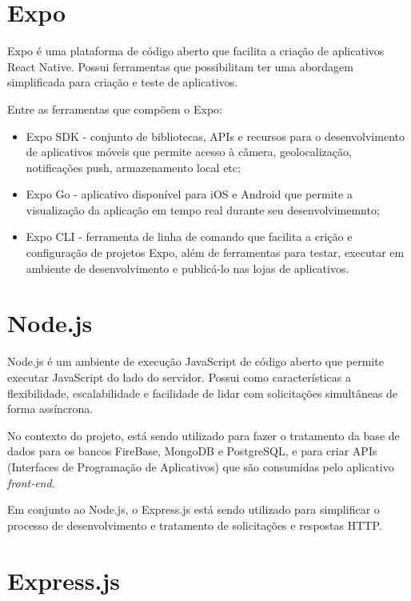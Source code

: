 \section{Expo}
\label{sec:Expo}
Expo é uma plataforma de código aberto que facilita a criação de aplicativos React Native. Possui ferramentas que  
possibilitam ter uma abordagem simplificada para criação e teste de aplicativos.

\begin{description}
    \item Entre as ferramentas que compõem o Expo:
          \begin{itemize}
              \item Expo SDK - conjunto de bibliotecas, APIs e recursos para o desenvolvimento de aplicativos móveis que permite acesso 
              à câmera, geolocalização, notificações push, armazenamento local etc;

              \item Expo Go - aplicativo disponível para iOS e Android que permite a visualização da aplicação em tempo real durante seu 
              desenvolvimemnto;

              \item Expo CLI - ferramenta de linha de comando que facilita a crição e configuração de projetos Expo, além de ferramentas para 
              testar, executar em ambiente de desenvolvimento e publicá-lo nas lojas de aplicativos.
          \end{itemize}
\end{description}

\section{Node.js}
\label{sec:Node.js}
Node.js é um ambiente de execução JavaScript de código aberto que permite executar JavaScript do lado do servidor. Possui como características 
a flexibilidade, escalabilidade e facilidade de lidar com solicitações simultâneas de forma assíncrona.

No contexto do projeto, está sendo utilizado para fazer o tratamento da base de dados para os bancos FireBase, MongoDB e PostgreSQL, e para criar 
APIs (Interfaces de Programação de Aplicativos) que são consumidas pelo aplicativo \textit{front-end}.

Em conjunto ao Node.js, o Express.js está sendo utilizado para simplificar o processo de desenvolvimento e tratamento de solicitações e respostas HTTP.

\section{Express.js}
\label{sec:Express.js}
